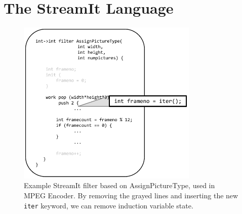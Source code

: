 %
%
%
%
%
%

\section{The StreamIt Language}
\label{sec:streamit}


\begin{figure}[t]
\centering
\includegraphics[width=3.4in]{figures/streamit-filter-example.pdf}
\caption{Example StreamIt filter based on AssignPictureType, used in MPEG Encoder. By removing the grayed lines and inserting the new {\tt iter} keyword, we can remove induction variable state. \protect\label{fig:apt-pipeline}}
\end{figure}

